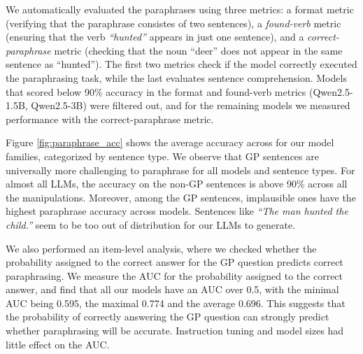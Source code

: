 We automatically evaluated the paraphrases using three metrics: a format metric (verifying that the paraphrase consistes of two sentences), a \emph{found-verb} metric (ensuring that the verb \emph{``hunted''} appears in just one sentence), and a \emph{correct-paraphrase} metric (checking that the noun ``deer'' does not appear in the same sentence as ``hunted''). The first two metrics check if the model correctly executed the paraphrasing task, while the last evaluates sentence comprehension. Models that scored below 90\% accuracy in the format and found-verb metrics (Qwen2.5-1.5B, Qwen2.5-3B) were filtered out, and for the remaining  models we measured performance with the correct-paraphrase metric.


Figure \ref{fig:paraphrase_acc} shows the average accuracy across for our model families, categorized by sentence type. We observe that GP sentences are universally more challenging to paraphrase for all models and sentence types. For almost all LLMs, the accuracy on the non-GP sentences is above 90\% across all the manipulations. Moreover, among the GP sentences, implausible ones have the highest paraphrase accuracy across models. Sentences like \emph{``The man hunted the child.''} seem to be too out of distribution for our LLMs to generate.

    We also performed an item-level analysis, where we checked whether the probability assigned to the correct answer for the GP question predicts correct paraphrasing. We measure the AUC for the probability assigned to the correct answer, and find that all our models have an AUC over 0.5, with the minimal AUC being 0.595, the maximal 0.774 and the average 0.696. This suggests that the probability of correctly answering the GP question can strongly predict whether paraphrasing will be accurate. Instruction tuning and model sizes had little effect on the AUC. 

